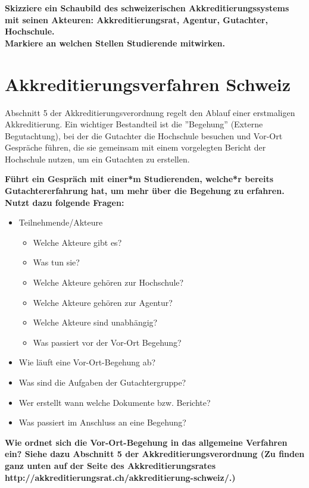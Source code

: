 \documentclass{scrartcl}
\begin{document}
\textbf{Skizziere ein Schaubild des schweizerischen Akkreditierungssystems mit seinen Akteuren: Akkreditierungsrat, Agentur, Gutachter, Hochschule. \\
Markiere an welchen Stellen Studierende mitwirken.}


\newpage
\section*{Akkreditierungsverfahren Schweiz}
Abschnitt 5 der Akkreditierungsverordnung regelt den Ablauf einer erstmaligen Akkreditierung. Ein wichtiger Bestandteil ist die ''Begehung'' (Externe Begutachtung), bei der die Gutachter die Hochschule besuchen und Vor-Ort Gespräche führen, die sie gemeinsam mit einem vorgelegten Bericht der Hochschule nutzen, um ein Gutachten zu erstellen.

\vspace{0.5cm}

\textbf{Führt ein Gespräch mit einer*m Studierenden, welche*r bereits Gutachtererfahrung hat, um mehr über die Begehung zu erfahren. Nutzt dazu folgende Fragen: }

\begin{itemize}
\item Teilnehmende/Akteure
	\begin{itemize}
		\item Welche Akteure gibt es?
		\item Was tun sie?
		\item Welche Akteure gehören zur Hochschule?
		\item Welche Akteure gehören zur Agentur?
		\item Welche Akteure sind unabhängig?
		\item Was passiert vor der Vor-Ort Begehung?
	\end{itemize}
\item Wie läuft eine Vor-Ort-Begehung ab?
\item Was sind die Aufgaben der Gutachtergruppe?
\item Wer erstellt wann welche Dokumente bzw. Berichte?
\item Was passiert im Anschluss an eine Begehung?
\end{itemize}

\textbf{Wie ordnet sich die Vor-Ort-Begehung in das allgemeine Verfahren ein? Siehe dazu Abschnitt 5 der Akkreditierungsverordnung (Zu finden ganz unten auf der Seite des Akkreditierungsrates\\
http://akkreditierungsrat.ch/akkreditierung-schweiz/.)}
\end{document}
